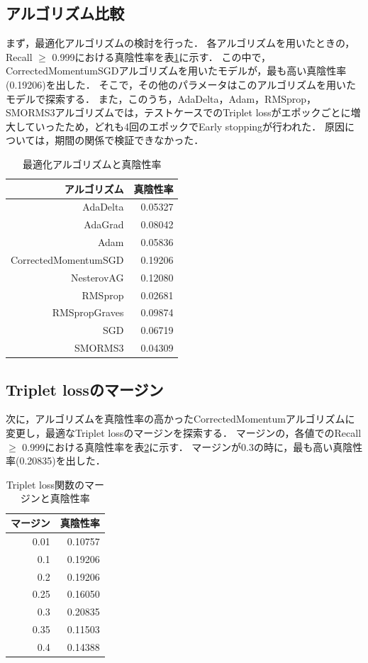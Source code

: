 \documentclass[10pt]{jarticle}
\begin{document}
\subsection{アルゴリズム比較}
まず，最適化アルゴリズムの検討を行った．
各アルゴリズムを用いたときの，Recall $\ge$ 0.999における真陰性率を表\ref{algorithm}に示す．
この中で，CorrectedMomentumSGDアルゴリズムを用いたモデルが，最も高い真陰性率(0.19206)を出した．
そこで，その他のパラメータはこのアルゴリズムを用いたモデルで探索する．
また，このうち，AdaDelta，Adam，RMSprop，SMORMS3アルゴリズムでは，テストケースでのTriplet lossがエポックごとに増大していったため，どれも4回のエポックでEarly stoppingが行われた．
原因については，期間の関係で検証できなかった．
\begin{table}[H]
\centering
\caption{最適化アルゴリズムと真陰性率}
\label{algorithm}
\centering
\begin{tabular}{rr} \hline
アルゴリズム & 真陰性率 \\ \hline
AdaDelta & 0.05327 \\ %
AdaGrad & 0.08042 \\ %
Adam & 0.05836 \\ %
CorrectedMomentumSGD & 0.19206 \\ %
NesterovAG & 0.12080 \\ %
RMSprop & 0.02681 \\ %
RMSpropGraves & 0.09874 \\ %
SGD & 0.06719 \\ %
SMORMS3 & 0.04309 \\ \hline %
\end{tabular}
\end{table}

\subsection{Triplet lossのマージン}
次に，アルゴリズムを真陰性率の高かったCorrectedMomentumアルゴリズムに変更し，最適なTriplet lossのマージンを探索する．
マージンの，各値でのRecall $\ge$ 0.999における真陰性率を表\ref{margin}に示す．
マージンが0.3の時に，最も高い真陰性率(0.20835)を出した．
\begin{table}[H]
\centering
\caption{Triplet loss関数のマージンと真陰性率}
\label{margin}
\begin{tabular}{rr} \hline
マージン & 真陰性率 \\ \hline
0.01 & 0.10757  \\ %
0.1 & 0.19206 \\ %
0.2 & 0.19206 \\ %
0.25 & 0.16050 \\ %
0.3 & 0.20835 \\ %
0.35 & 0.11503 \\ %
0.4 & 0.14388 \\ \hline %
\end{tabular}
\end{table}
\end{document}
